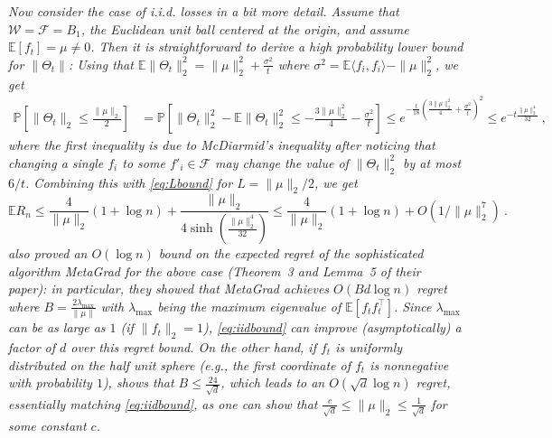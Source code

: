 \documentclass[english]{article}
\newcommand{\cW}{\mathcal{W}}
\newcommand{\cF}{\mathcal{F}}
\newcommand{\E}{\mathbb{E}}
\newcommand{\inpro}[2]{\langle #1, #2\rangle}
\newcommand{\Prob}[1]{\mathbb{P}\left[#1\right]}
\begin{document}
\begin{remark} \label{rem:iid} \em Now consider the case of i.i.d. losses in a bit more detail. Assume that $\cW=\cF=B_1$, the Euclidean unit ball centered at the origin, and assume $\E[f_t]=\mu \neq 0$.
Then it is straightforward to derive a high probability lower bound for $\|\Theta_t\|$: Using that $\E{\|\Theta_t\|_2^2} = \|\mu\|_2^2 + \frac{\sigma^2}{t}$ where $\sigma^2=\E{\inpro{f_i}{f_i}}-\|\mu\|_2^2$, we get
\begin{align*}
\Prob{\|\Theta_t\|_2 \le \frac{\|\mu\|_2}{2}} & 
= \Prob{ \|\Theta_t\|^2_2 - \E{\|\Theta_t\|^2_2} \le -\frac{3\|\mu\|_2^2}{4} - \frac{\sigma^2}{t}}
\le e^{-\frac{t}{18}\left(\frac{3\|\mu\|_2^2}{4} + \frac{\sigma^2}{t}\right)^2} \le e^{-t\frac{\|\mu\|_2^4}{32}}~,
\end{align*}
where the first inequality is due to McDiarmid's inequality \citep{BoLuMa13} after noticing that changing a single $f_i$ to some $f'_i \in \cF$ may change the value of $\|\Theta_t\|_2^2$ by at most $6/t$.
Combining this with \eqref{eq:Lbound} for $L=\|\mu\|_2/2$, we get
\begin{equation}\label{eq:iidbound}
\E{R_n} \le \frac{4}{\|\mu\|_2} (1 + \log n) + \frac{\|\mu\|_2}{4 \sinh\left(\frac{\|\mu\|_2^4}{32}\right)} 
\le  \frac{4}{\|\mu\|_2} (1 + \log n) + O(1/\|\mu\|_2^7)~.
\end{equation}
\citet{koolen2016combiningA} also proved an  $O(\log n )$  bound on the expected regret of the sophisticated algorithm MetaGrad for the above case (Theorem~3 and Lemma~5 of their paper): in particular, they showed that MetaGrad achieves $O(Bd\log n)$ regret where $B = \frac{2\lambda_{\max}}{\|\mu\|}$ with $\lambda_{\max}$ being the maximum eigenvalue of $\E[f_tf_t^{\top}]$.
Since $\lambda_{\max}$ can be as large as $1$ (if $\|f_t\|_2=1$), \eqref{eq:iidbound} can improve (asymptotically) a factor of $d$ over this regret bound. On the other hand, if 
$f_t$ is uniformly distributed on the half unit sphere (e.g., the first coordinate of $f_t$ is nonnegative with probability $1$), \citet{koolen2016combiningA} shows that $B\le \frac{24}{\sqrt{d}}$, which 
leads to an $O(\sqrt{d}\log n)$ regret, essentially matching \eqref{eq:iidbound}, as one can show that $\frac{c}{\sqrt{d}}\le \|\mu\|_2 \le \frac{1}{\sqrt{d}}$ for some constant $c$.
\end{remark}

\bigskip
\end{document}
